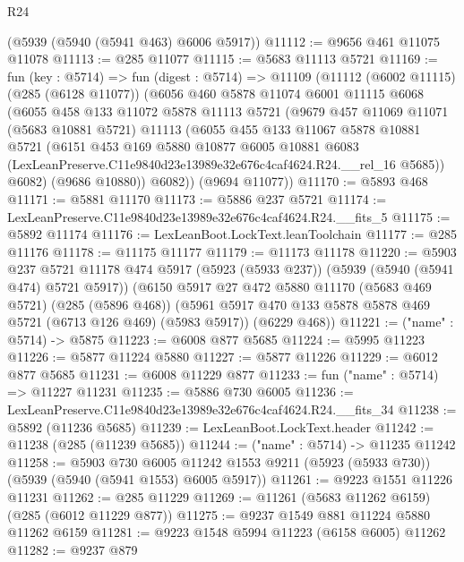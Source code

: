 \begin{lexlean}{R24}
\begin{coremodule}
    (@5939 (@5940 (@5941 @463) @6006 @5917))
@11112 := @9656 @461 @11075 @11078
@11113 := @285 @11077
@11115 := @5683 @11113 @5721
@11169 := fun (key : @5714) =>
  fun (digest : @5714) =>
  @11109
    (@11112
      (@6002 @11115)
      (@285 (@6128 @11077))
      (@6056
        @460
        @5878
        @11074
        @6001
        @11115
        @6068
        (@6055
          @458
          @133
          @11072
          @5878
          @11113
          @5721
          (@9679
            @457
            @11069
            @11071
            (@5683 @10881 @5721)
            @11113
            (@6055
              @455
              @133
              @11067
              @5878
              @10881
              @5721
              (@6151
                @453
                @169
                @5880
                @10877
                @6005
                @10881
                @6083
                (LexLeanPreserve.C11e9840d23e13989e32e676c4caf4624.R24.__rel_16 @5685))
              @6082)
            (@9686 @10880))
          @6082))
      (@9694 @11077))
@11170 := @5893 @468
@11171 := @5881 @11170
@11173 := @5886 @237 @5721
@11174 := LexLeanPreserve.C11e9840d23e13989e32e676c4caf4624.R24.__fits_5
@11175 := @5892 @11174
@11176 := LexLeanBoot.LockText.leanToolchain
@11177 := @285 @11176
@11178 := @11175 @11177
@11179 := @11173 @11178
@11220 := @5903
    @237
    @5721
    @11178
    @474
    @5917
    (@5923 (@5933 @237))
    (@5939 (@5940 (@5941 @474) @5721 @5917))
    (@6150
      @5917
      @27
      @472
      @5880
      @11170
      (@5683 @469 @5721)
      (@285 (@5896 @468))
      (@5961 @5917 @470 @133 @5878 @5878 @469 @5721 (@6713 @126 @469) (@5983 @5917))
      (@6229 @468))
@11221 := ("name" : @5714) -> @5875
@11223 := @6008 @877 @5685
@11224 := @5995 @11223
@11226 := @5877 @11224 @5880
@11227 := @5877 @11226
@11229 := @6012 @877 @5685
@11231 := @6008 @11229 @877
@11233 := fun ("name" : @5714) => @11227 @11231
@11235 := @5886 @730 @6005
@11236 := LexLeanPreserve.C11e9840d23e13989e32e676c4caf4624.R24.__fits_34
@11238 := @5892 (@11236 @5685)
@11239 := LexLeanBoot.LockText.header
@11242 := @11238 (@285 (@11239 @5685))
@11244 := ("name" : @5714) -> @11235 @11242
@11258 := @5903
    @730
    @6005
    @11242
    @1553
    @9211
    (@5923 (@5933 @730))
    (@5939 (@5940 (@5941 @1553) @6005 @5917))
@11261 := @9223 @1551 @11226 @11231
@11262 := @285 @11229
@11269 := @11261 (@5683 @11262 @6159) (@285 (@6012 @11229 @877))
@11275 := @9237 @1549 @881 @11224 @5880 @11262 @6159
@11281 := @9223 @1548 @5994 @11223 (@6158 @6005) @11262
@11282 := @9237 @879

\end{coremodule}
\end{lexlean}
